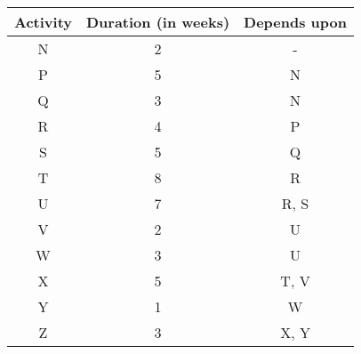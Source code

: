 \begin{tabular}{|c|c|c|}
\hline
\textbf{Activity} & \textbf{Duration (in weeks)} & \textbf{Depends upon} \\
\hline
N & 2 & - \\
P & 5 & N \\
Q & 3 & N \\
R & 4 & P \\
S & 5 & Q \\
T & 8 & R \\
U & 7 & R, S \\
V & 2 & U \\
W & 3 & U \\
X & 5 & T, V \\
Y & 1 & W \\
Z & 3 & X, Y \\
\hline
\end{tabular}
